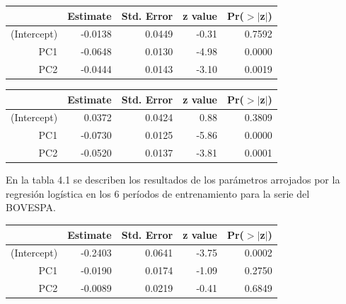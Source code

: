\documentclass[a4paper,12pt]{Latex/Classes/PhDthesisPSnPDF}
\begin{document}
\newpage
\begin{center}
\begin{table}[ht]
\centering
\begin{tabular}{rrrrr}
  \hline
 & Estimate & Std. Error & z value & Pr($>$$|$z$|$) \\ 
  \hline
(Intercept) & -0.0138 & 0.0449 & -0.31 & 0.7592 \\ 
  PC1 & -0.0648 & 0.0130 & -4.98 & 0.0000 \\ 
  PC2 & -0.0444 & 0.0143 & -3.10 & 0.0019 \\ 
   \hline
\end{tabular}
\end{table}\end{center}
\begin{center}
\begin{table}[ht]
\centering
\begin{tabular}{rrrrr}
  \hline
 & Estimate & Std. Error & z value & Pr($>$$|$z$|$) \\ 
  \hline
(Intercept) & 0.0372 & 0.0424 & 0.88 & 0.3809 \\ 
  PC1 & -0.0730 & 0.0125 & -5.86 & 0.0000 \\ 
  PC2 & -0.0520 & 0.0137 & -3.81 & 0.0001 \\ 
   \hline
\end{tabular}
\end{table}\end{center}



En la tabla 4.1 se describen los resultados de los parámetros arrojados por la regresión logística en los 6 períodos de entrenamiento para la serie del BOVESPA.
\begin{center}
\begin{table}[ht]
\centering
\begin{tabular}{rrrrr}
  \hline
 & Estimate & Std. Error & z value & Pr($>$$|$z$|$) \\ 
  \hline
(Intercept) & -0.2403 & 0.0641 & -3.75 & 0.0002 \\ 
  PC1 & -0.0190 & 0.0174 & -1.09 & 0.2750 \\ 
  PC2 & -0.0089 & 0.0219 & -0.41 & 0.6849 \\ 
   \hline
\end{tabular}
\end{table}\end{center}
\end{document}
